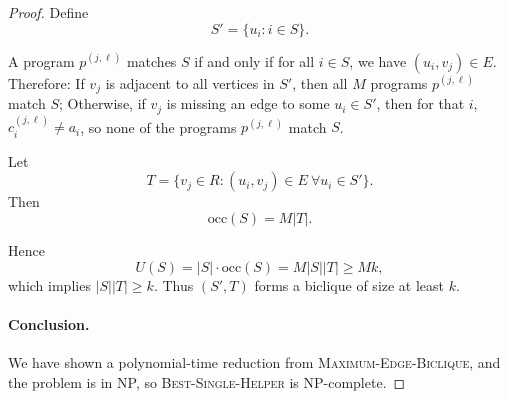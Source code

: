 \begin{proof}
Define
\[
S' = \{u_i : i \in S\}.
\]

A program $p^{(j,\ell)}$ matches $S$ if and only if for all $i \in S$,
we have $(u_i,v_j)\in E$. Therefore: If $v_j$ is adjacent to all vertices in $S'$, then all $M$ programs
  $p^{(j,\ell)}$ match $S$; Otherwise, if $v_j$ is missing an edge to some $u_i \in S'$, then for that $i$,
  $c_i^{(j,\ell)} \neq a_i$, so none of the programs $p^{(j,\ell)}$ match $S$.

Let
\[
T = \{v_j \in R : (u_i,v_j)\in E \ \forall u_i \in S'\}.
\]
Then
\[
\mathrm{occ}(S) = M|T|.
\]

Hence
\[
U(S) = |S|\cdot \mathrm{occ}(S) = M|S||T| \ge Mk,
\]
which implies $|S||T| \ge k$.
Thus $(S',T)$ forms a biclique of size at least $k$.

\par\noindent
\paragraph{Conclusion.}
We have shown a polynomial-time reduction from
\textsc{Maximum-Edge-Biclique}, and the problem is in NP,
so \textsc{Best-Single-Helper} is NP-complete.
\end{proof}